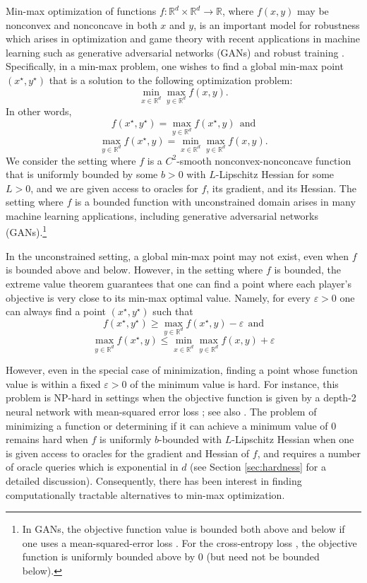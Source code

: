 \documentclass[11pt,letterpaper]{article}
\renewcommand{\epsilon}{\varepsilon}
\begin{document}
Min-max optimization of functions $f: \mathbb{R}^d \times \mathbb{R}^d \rightarrow \mathbb{R}$, where $f(x,y)$ may be nonconvex and nonconcave in both $x$ and $y$, is an important model for robustness which arises in  optimization and game theory \cite{sion1957game} with  recent applications in machine learning such as generative adversarial networks (GANs) \cite{goodfellow2014generative} 
 and robust training \cite{madry2017towards}. 
Specifically, in a min-max problem, one wishes to find a global min-max point $(x^\star, y^\star)$ that is a solution to the following optimization problem:
%
 $$\min_{x \in \mathbb{R}^d} \max_{y \in \mathbb{R}^d} f(x,y).$$
 \smallskip
In other words, $$f(x^\star,y^\star) = \max_{y\in \mathbb{R}^d} f(x^\star,y) \ \ \mbox{and} $$ $$ \max_{y\in \mathbb{R}^d} f(x^\star, y) = \min_{x \in \mathbb{R}^d} \max_{y\in \mathbb{R}^d} f(x,y).$$ 
%
 We consider the setting where $f$ is a $C^2$-smooth nonconvex-nonconcave function that is uniformly bounded by some $b>0$ with $L$-Lipschitz Hessian for some $L >0$, and we are given access to oracles for $f$, its gradient, and its Hessian.
  The setting where $f$ is a bounded function with unconstrained domain arises in many machine learning applications, including generative adversarial networks (GANs).\footnote{In GANs, the objective function value is bounded both above and below if one uses a mean-squared-error loss \cite{mao2017least}.  For the cross-entropy loss \cite{goodfellow2014generative}, the objective function is uniformly bounded above by 0 (but need not be bounded below).}



\smallskip
%
In the unconstrained setting, a global min-max point may not exist, even when $f$ is bounded above and below. 
%
However, in the setting where $f$ is bounded, the extreme value theorem guarantees that one can find a point where each player's objective is very close to its min-max optimal value. 
% 
Namely, for every $\epsilon>0$ one can always find a point $(x^\star,y^\star)$ such that 
$$  f(x^\star, y^\star) \geq \max_{y \in \mathbb{R}^d} f(x^\star, y) - \epsilon \ \ \mbox{and}$$
$$
 \max_{y\in \mathbb{R}^d} f(x^\star, y) \leq \min_{x \in \mathbb{R}^d} \max_{y\in \mathbb{R}^d} f(x,y) + \epsilon %
%
$$

%
\noindent
 However, even in the special case of minimization, finding a point whose function value is within a fixed  $\epsilon > 0$ of the minimum value is hard.
For instance, this problem is NP-hard in settings when the objective function is given by a depth-2 neural network with %
  mean-squared error loss \cite{manurangsi2018computational}; see also  \cite{blum1989training}.
 The problem of minimizing a function or determining if it can achieve a minimum value of $0$ remains hard when $f$ is uniformly $b$-bounded with $L$-Lipschitz Hessian when one is given access to oracles for the gradient and Hessian of $f$, and requires a number of oracle queries which is exponential in  $d$ (see Section \ref{sec:hardness} for a detailed discussion).
Consequently, there has been  interest in finding computationally tractable alternatives to min-max optimization.
%
\end{document}
